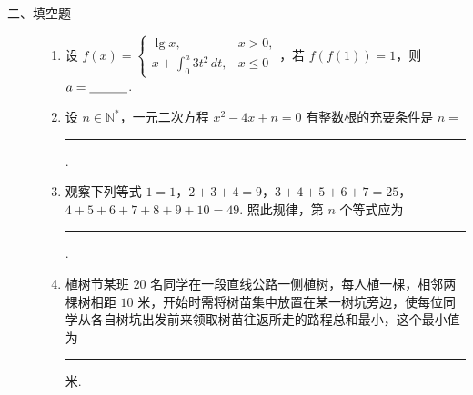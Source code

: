 \begin{description}

    \item[二、填空题]

    \begin{enumerate}[leftmargin=5pt]

      \addtocounter{enumi}{+10}

        \item 设 \(f(x)=\begin{cases}
\lg x, & x>0,\\
x+\int_{0}^{a} 3t^{2}\,dt, & x\leqslant 0
\end{cases}\)，若 \(f(f(1))=1\)，则 \(a=\rule[-0.3ex]{3em}{0.4pt}\).

        \item 设 \(n \in \mathbb{N}^*\)，一元二次方程 \(x^2 - 4x + n = 0\) 有整数根的充要条件是 \(n = \)\rule[-0.3ex]{3em}{0.4pt}.

        \item 观察下列等式 \(1 = 1\)，\(2 + 3 + 4 = 9\)，\(3 + 4 + 5 + 6 + 7 = 25\)，\(4 + 5 + 6 + 7 + 8 + 9 + 10 = 49\). 照此规律，第 \(n\) 个等式应为\rule[-0.3ex]{3em}{0.4pt}.

        \item 植树节某班 \(20\) 名同学在一段直线公路一侧植树，每人植一棵，相邻两棵树相距 \(10\text{ 米}\)，开始时需将树苗集中放置在某一树坑旁边，使每位同学从各自树坑出发前来领取树苗往返所走的路程总和最小，这个最小值为\rule[-0.3ex]{3em}{0.4pt}\(\text{米}\).

    \end{enumerate}

\end{description}

